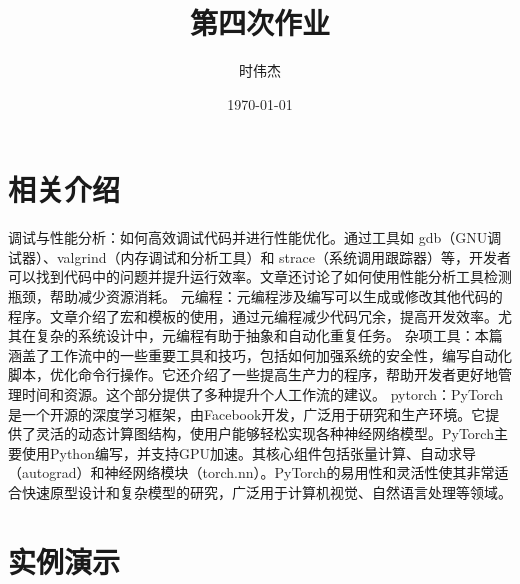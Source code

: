\documentclass{article}
\title{第四次作业}
\author{时伟杰}
\date{\today}
\begin{document}
\maketitle

\section{相关介绍}
调试与性能分析：如何高效调试代码并进行性能优化。通过工具如 gdb（GNU调试器）、valgrind（内存调试和分析工具）和 strace（系统调用跟踪器）等，开发者可以找到代码中的问题并提升运行效率。文章还讨论了如何使用性能分析工具检测瓶颈，帮助减少资源消耗。
元编程：元编程涉及编写可以生成或修改其他代码的程序。文章介绍了宏和模板的使用，通过元编程减少代码冗余，提高开发效率。尤其在复杂的系统设计中，元编程有助于抽象和自动化重复任务。
杂项工具：本篇涵盖了工作流中的一些重要工具和技巧，包括如何加强系统的安全性，编写自动化脚本，优化命令行操作。它还介绍了一些提高生产力的程序，帮助开发者更好地管理时间和资源。这个部分提供了多种提升个人工作流的建议。
pytorch：PyTorch是一个开源的深度学习框架，由Facebook开发，广泛用于研究和生产环境。它提供了灵活的动态计算图结构，使用户能够轻松实现各种神经网络模型。PyTorch主要使用Python编写，并支持GPU加速。其核心组件包括张量计算、自动求导（autograd）和神经网络模块（torch.nn）。PyTorch的易用性和灵活性使其非常适合快速原型设计和复杂模型的研究，广泛用于计算机视觉、自然语言处理等领域。
\section{实例演示}
\end{document}
